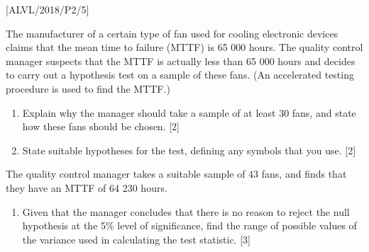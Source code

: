 \item {[}ALVL/2018/P2/5{]}

The manufacturer of a certain type of fan used for cooling electronic
devices claims that the mean time to failure (MTTF) is 65 000 hours.
The quality control manager suspects that the MTTF is actually less
than 65 000 hours and decides to carry out a hypothesis test on a
sample of these fans. (An accelerated testing procedure is used to
find the MTTF.)
\begin{enumerate}
\item Explain why the manager should take a sample of at least 30 fans,
and state how these fans should be chosen.\hfill{} {[}2{]}
\item State suitable hypotheses for the test, defining any symbols that
you use. \hfill{}{[}2{]}
\end{enumerate}
The quality control manager takes a suitable sample of 43 fans, and
finds that they have an MTTF of 64 230 hours.
\begin{enumerate}
\item Given that the manager concludes that there is no reason to reject
the null hypothesis at the 5\% level of significance, find the range
of possible values of the variance used in calculating the test statistic.
\hfill{}{[}3{]}
\end{enumerate}
